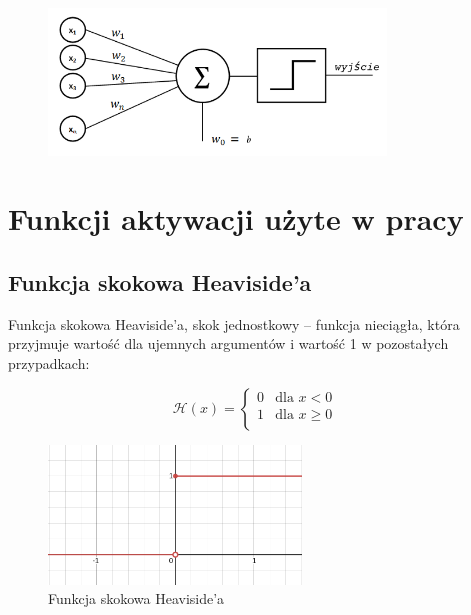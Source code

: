 \documentclass{article}
\begin{document}
\begin{figure}[H]
	\centering
	\includegraphics[width=0.8\textwidth,keepaspectratio=true]{neuron_rosenblatta}
\end{figure}




\section{Funkcji aktywacji użyte w pracy}

\subsection{Funkcja skokowa Heaviside’a}
Funkcja skokowa Heaviside’a, skok jednostkowy – funkcja nieciągła, która przyjmuje wartość dla ujemnych argumentów i wartość 1 w pozostałych przypadkach:

\begin{equation}
	\mathcal{H}(x) = 
	\begin{cases}
		0 & \text{dla $x < 0$}\\
		1 & \text{dla $x \geqslant 0$ }\\
	\end{cases}    
\end{equation}

\begin{figure}[H]
	\centering
	\includegraphics[width=0.6\textwidth,keepaspectratio=true]{Heaviside}
	\caption{
		Funkcja skokowa Heaviside’a
	}
	\label{Heaviside}
\end{figure}
\end{document}
